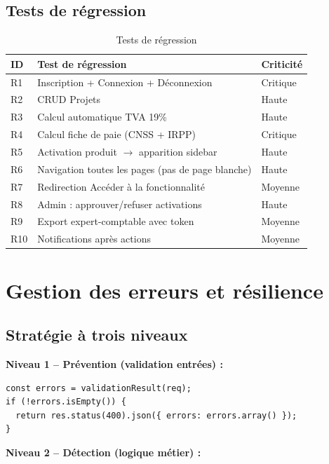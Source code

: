 \subsection{Tests de régression}

\begin{table}[H]
\centering
\caption{Tests de régression}
\label{tab:regression}
\begin{tabular}{|l|l|l|}
\hline
\textbf{ID} & \textbf{Test de régression} & \textbf{Criticité} \\
\hline
R1 & Inscription + Connexion + Déconnexion & Critique \\
\hline
R2 & CRUD Projets & Haute \\
\hline
R3 & Calcul automatique TVA 19\% & Haute \\
\hline
R4 & Calcul fiche de paie (CNSS + IRPP) & Critique \\
\hline
R5 & Activation produit $\rightarrow$ apparition sidebar & Haute \\
\hline
R6 & Navigation toutes les pages (pas de page blanche) & Haute \\
\hline
R7 & Redirection Accéder à la fonctionnalité & Moyenne \\
\hline
R8 & Admin : approuver/refuser activations & Haute \\
\hline
R9 & Export expert-comptable avec token & Moyenne \\
\hline
R10 & Notifications après actions & Moyenne \\
\hline
\end{tabular}
\end{table}

\section{Gestion des erreurs et résilience}

\subsection{Stratégie à trois niveaux}

\textbf{Niveau 1 -- Prévention (validation entrées) :}

\begin{verbatim}
const errors = validationResult(req);
if (!errors.isEmpty()) {
  return res.status(400).json({ errors: errors.array() });
}
\end{verbatim}

\textbf{Niveau 2 -- Détection (logique métier) :}


